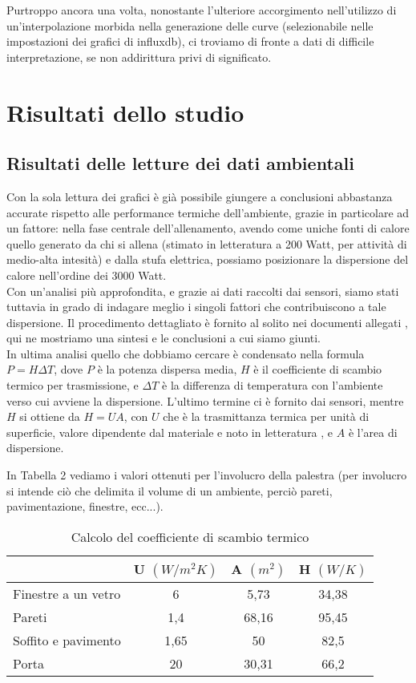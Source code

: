 \documentclass[fleqn,10pt]{SelfArx} %
\begin{document}
Purtroppo ancora una volta, nonostante l'ulteriore accorgimento nell'utilizzo di un'interpolazione morbida nella generazione delle 
curve (selezionabile nelle impostazioni dei grafici di influxdb), ci troviamo di fronte a dati di difficile interpretazione, se non 
addirittura privi di significato.

\section{Risultati dello studio}

\subsection{Risultati delle letture dei dati ambientali}
Con la sola lettura dei grafici è già possibile giungere a conclusioni abbastanza accurate rispetto alle performance termiche 
dell'ambiente, grazie in particolare ad un fattore: nella fase centrale dell'allenamento, avendo come uniche fonti di calore 
quello generato da chi si allena (stimato in letteratura a 200 Watt, per attività di medio-alta intesità) e dalla stufa 
elettrica, possiamo posizionare la dispersione del calore nell'ordine dei 3000 Watt. \\
Con un'analisi più approfondita, e grazie ai dati raccolti dai sensori, siamo stati tuttavia in grado di indagare meglio i 
singoli fattori che contribuiscono a tale dispersione. Il procedimento dettagliato è fornito al solito nei documenti allegati \cite{ing_termo}, 
qui ne mostriamo una sintesi e le conclusioni a cui siamo giunti.\\

In ultima analisi quello che dobbiamo cercare è condensato nella formula $ P = H \Delta T $, dove $ P $ è la potenza dispersa 
media, $ H $ è il coefficiente di scambio termico per trasmissione, e $ \Delta T $ è la differenza di temperatura con l'ambiente 
verso cui avviene la dispersione. L'ultimo termine ci è fornito dai sensori, mentre $ H $ si ottiene da $ H = U A $, 
con $ U $ che è la trasmittanza termica per unità di superficie, valore dipendente dal materiale e noto in letteratura 
\cite{trasmittanza}, e $ A $ è l'area di dispersione.

In Tabella 2 vediamo i valori ottenuti per l'involucro della palestra (per involucro si intende ciò che delimita il volume di un 
ambiente, perciò pareti, pavimentazione, finestre, ecc...).

\begin{table}[hbt]
	\caption{Calcolo del coefficiente di scambio termico}
	\centering
	\begin{tabular}{lccc}
		\toprule
			 & \textbf{U} $ (W/m^2K) $ & \textbf{A} $ (m^2) $ & \textbf{H} $ (W/K) $ \\
		\midrule
		Finestre a un vetro & 6 & 5,73 & 34,38 \\
		Pareti & 1,4 & 68,16 & 95,45 \\
		Soffito e pavimento & 1,65 & 50 & 82,5 \\
		Porta & 20 & 30,31 & 66,2 \\
		\bottomrule
	\end{tabular}
	\label{tab:label}
\end{table}
\end{document}
